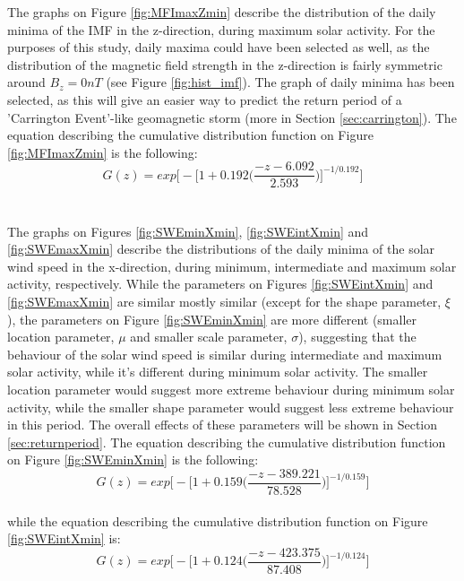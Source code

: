 \documentclass[11pt]{article}
\begin{document}
        The graphs on Figure \ref{fig:MFImaxZmin} describe the distribution of the daily minima of the IMF in the z-direction, during maximum solar activity. For the purposes of this study, daily maxima could have been selected as well, as the distribution of the magnetic field strength in the z-direction is fairly symmetric around $B_z=0nT$ (see Figure \ref{fig:hist_imf}). The graph of daily minima has been selected, as this will give an easier way to predict the return period of a 'Carrington Event'-like geomagnetic storm (more in Section \ref{sec:carrington}). The equation describing the cumulative distribution function on Figure \ref{fig:MFImaxZmin} is the following:
        \begin{equation}
            G(z) = exp\Bigg [-\Bigg [1+0.192 \Bigg (\frac{-z-6.092}{2.593}\Bigg )\Bigg ]^{-1/0.192}\Bigg ]
        \end{equation}\\ \\
        The graphs on Figures \ref{fig:SWEminXmin}, \ref{fig:SWEintXmin} and \ref{fig:SWEmaxXmin} describe the distributions of the daily minima of the solar wind speed in the x-direction, during minimum, intermediate and maximum solar activity, respectively. While the parameters on Figures \ref{fig:SWEintXmin} and \ref{fig:SWEmaxXmin} are similar mostly similar (except for the shape parameter, $\xi$), the parameters on Figure \ref{fig:SWEminXmin} are more different (smaller location parameter, $\mu$ and smaller scale parameter, $\sigma$), suggesting that the behaviour of the solar wind speed is similar during intermediate and maximum solar activity, while it's different during minimum solar activity. The smaller location parameter would suggest more extreme behaviour during minimum solar activity, while the smaller shape parameter would suggest less extreme behaviour in this period. The overall effects of these parameters will be shown in Section \ref{sec:returnperiod}. The equation describing the cumulative distribution function on Figure \ref{fig:SWEminXmin} is the following:
        \begin{equation}
            G(z) = exp\Bigg [-\Bigg [1+0.159 \Bigg (\frac{-z-389.221}{78.528}\Bigg )\Bigg ]^{-1/0.159}\Bigg ]
        \end{equation}\\
        while the equation describing the cumulative distribution function on Figure \ref{fig:SWEintXmin} is:
        \begin{equation}
            G(z) = exp\Bigg [-\Bigg [1+0.124 \Bigg (\frac{-z-423.375}{87.408}\Bigg )\Bigg ]^{-1/0.124}\Bigg ]
        \end{equation}\\
\end{document}
